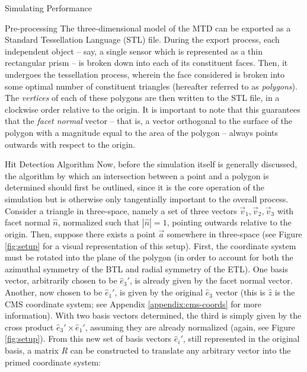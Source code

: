 \begin{section}{Simulating Performance}
\begin{subsection}{Pre-processing}
The three-dimensional model of the MTD can be exported as a Standard Tessellation Language (STL) file. During the export process, each independent object -- say, a single sensor which is represented as a thin rectangular prism -- is broken down into each of its constituent faces. Then, it undergoes the tessellation process, wherein the face considered is broken into some optimal number of constituent triangles (hereafter referred to as \textit{polygons}). The \textit{vertices} of each of these polygons are then written to the STL file, in a clockwise order relative to the origin. It is important to note that this guarantees that the \textit{facet normal} vector -- that is, a vector orthogonal to the surface of the polygon with a magnitude equal to the area of the polygon -- always points outwards with respect to the origin.
\end{subsection}
\begin{subsection}{Hit Detection Algorithm}
Now, before the simulation itself is generally discussed, the algorithm by which an intersection between a point and a polygon is determined should first be outlined, since it is the core operation of the simulation but is otherwise only tangentially important to the overall process. Consider a triangle in three-space, namely a set of three vectors $\vec{v}_1, \vec{v}_2, \vec{v}_3$ with facet normal $\hat{n}$, normalized such that $|\hat{n}| = 1$, pointing outwards relative to the origin. Then, suppose there exists a point $\vec{a}$ somewhere in three-space (see Figure \ref{fig:setup} for a visual representation of this setup). First, the coordinate system must be rotated into the plane of the polygon (in order to account for both the azimuthal symmetry of the BTL and radial symmetry of the ETL). One basis vector, arbitrarily chosen to be $\hat{e}_3'$, is already given by the facet normal vector. Another, now chosen to be $\hat{e}_{1}'$, is given by the original $\hat{e}_3$ vector (this is $\hat{z}$ is the CMS coordinate system; see Appendix \ref{appendix:cms-coords} for more information). With two basis vectors determined, the third is simply given by the cross product $\hat{e}_3'\times\hat{e}_1'$, assuming they are already normalized (again, see Figure \ref{fig:setup}). From this new set of basis vectors $\hat{e}_i'$, still represented in the original basis, a matrix $R$ can be constructed to translate any arbitrary vector into the primed coordinate system:


\end{subsection}
\end{section}
